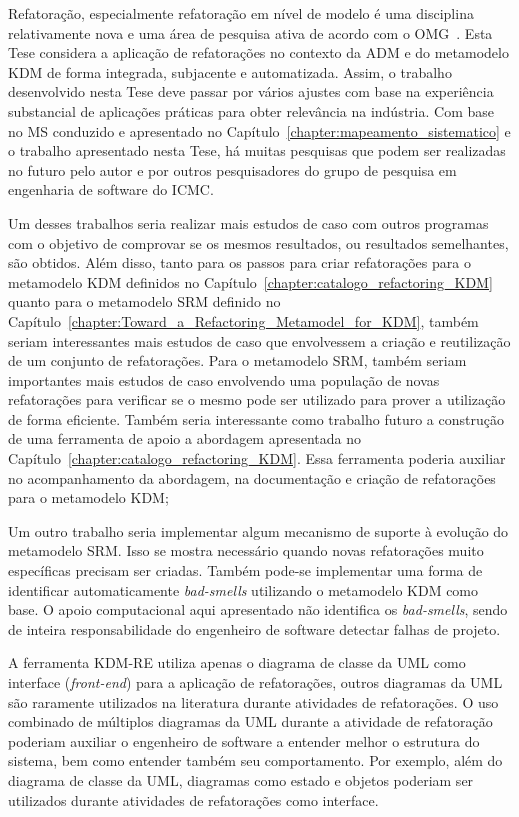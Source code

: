 Refatoração, especialmente refatoração em nível de modelo é uma disciplina relativamente nova e uma área de pesquisa ativa de acordo com o OMG~\cite{OMG_OMG, ADM:OMG}. Esta Tese considera a aplicação de refatorações no contexto da ADM e do metamodelo KDM de forma integrada, subjacente e automatizada. Assim, o trabalho desenvolvido nesta Tese deve passar por vários ajustes com base na experiência substancial de aplicações práticas para obter relevância na indústria. Com base no MS conduzido e apresentado no Capítulo~\ref{chapter:mapeamento_sistematico} e o trabalho apresentado nesta Tese, há muitas pesquisas que podem ser realizadas no futuro pelo autor e por outros pesquisadores do grupo de pesquisa em engenharia de software do ICMC.

Um desses trabalhos seria realizar mais estudos de caso com outros programas com o objetivo de comprovar se os mesmos resultados, ou resultados semelhantes, são obtidos. Além disso, tanto para os passos para criar refatorações para o metamodelo KDM definidos no Capítulo~\ref{chapter:catalogo_refactoring_KDM} quanto para o metamodelo SRM definido no Capítulo~\ref{chapter:Toward_a_Refactoring_Metamodel_for_KDM}, também seriam interessantes mais estudos de caso que envolvessem a criação e reutilização de um conjunto de refatorações. Para o metamodelo SRM, também seriam importantes mais estudos de caso envolvendo uma população de novas refatorações para verificar se o mesmo pode ser utilizado para prover a utilização de forma eficiente. Também seria interessante como trabalho futuro a construção de uma ferramenta de apoio a abordagem apresentada no Capítulo~\ref{chapter:catalogo_refactoring_KDM}. Essa ferramenta poderia auxiliar no acompanhamento da abordagem, na documentação e criação de refatorações para o metamodelo KDM;

Um outro trabalho seria implementar algum mecanismo de suporte à evolução do metamodelo SRM. Isso se mostra necessário quando novas refatorações muito específicas precisam ser criadas. Também pode-se implementar uma forma de identificar automaticamente \textit{bad-smells} utilizando o metamodelo KDM como base. O apoio computacional aqui apresentado não identifica os \textit{bad-smells}, sendo de inteira responsabilidade do engenheiro de software detectar falhas de projeto.


A ferramenta KDM-RE utiliza apenas o diagrama de classe da UML como interface (\textit{front-end}) para a aplicação de refatorações, outros diagramas da UML são raramente utilizados na literatura durante atividades de refatorações. O uso combinado de múltiplos diagramas da UML durante a atividade de refatoração poderiam auxiliar o engenheiro de software a entender melhor o estrutura do sistema, bem como entender também seu comportamento. Por exemplo, além do diagrama de classe da UML, diagramas como estado e objetos poderiam ser utilizados durante atividades de refatorações como interface. 

